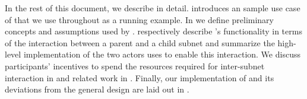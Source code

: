 In the rest of this document, we describe \ipc in detail.
 introduces an sample use case of \ipc that we use throughout as a running example.
In  we define preliminary concepts and assumptions used by \ipc.
 respectively describe \ipc's functionality in terms of the interaction between a parent and a child subnet and summarize the high-level implementation of the two actors \ipc uses to enable this interaction.
We discuss participants' incentives to spend the resources required for inter-subnet interaction in  and related work in .
Finally, our implementation of \ipc and its deviations from the general design are laid out in .
